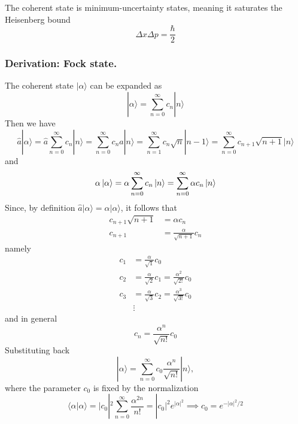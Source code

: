 \documentclass[../../../main.tex]{subfiles}
\begin{document}
The coherent state is minimum-uncertainty states, meaning it saturates the Heisenberg bound
\begin{equation*}
  \Delta x \Delta p = \frac{\hbar }{2}
\end{equation*}

\subsubsection{Derivation: Fock state.}
The coherent state $|\alpha\rangle$ can be expanded as
\begin{equation*}
  |\alpha\rangle = \sum_{n=0}^{\infty} c_n |n\rangle
\end{equation*}
Then we have
\begin{equation*}
  \hat{a} |\alpha\rangle = \hat{a} \sum_{n=0}^{\infty} c_n |n\rangle = \sum_{n=0}^{\infty} c_n \hat{a}|n\rangle = \sum_{n=1}^{\infty} c_n \sqrt{n}|n-1\rangle = \sum_{n=0}^{\infty} c_{n+1}\sqrt{n+1} |n\rangle
\end{equation*}
and
\begin{equation*}
  \alpha \ket{\alpha} =  \alpha \sum_{n=0 }^{\infty}c_n \ket{n}= \sum_{n=0 }^{\infty }\alpha c_n \ket{n}
\end{equation*}
Since, by definition $  \hat{a} |\alpha\rangle = \alpha |\alpha\rangle$, it follows that
\begin{align*}
  c_{n+1} \sqrt{n+1} & = \alpha c_n                    \\
  c_{n+1}            & = \frac{\alpha}{\sqrt{n+1}} c_n
\end{align*}
namely
\begin{align*}
  c_1 & =  \frac{\alpha}{\sqrt{1}} c_0                                 \\
  c_2 & =\frac{\alpha }{\sqrt{2}}c_1= \frac{\alpha^2}{\sqrt{2!}} c_0   \\
  c_3 & =  \frac{\alpha }{\sqrt{3 }}c_2=\frac{\alpha^3}{\sqrt{3!}} c_0 \\
      & \vdots
\end{align*}
and in general
\begin{equation*}
  c_n = \frac{\alpha^n}{\sqrt{n!}} c_0
\end{equation*}
Substituting back
\begin{equation*}
  |\alpha\rangle = \sum_{n=0}^{\infty} c_0 \frac{\alpha^n}{\sqrt{n!}} |n\rangle ,
\end{equation*}
where the parameter $c_0$ is fixed by the normalization
\begin{equation*}
  \langle \alpha | \alpha \rangle = |c_0|^2 \sum_{n=0}^{\infty} \frac{\alpha^{2n}}{n!} = |c_0|^2 e^{|\alpha|^2}\implies c_0 = e^{-|\alpha|^2/2}
\end{equation*}
\end{document}
